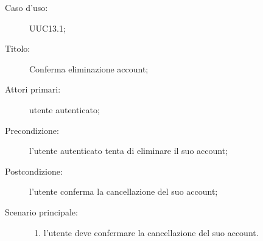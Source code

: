 \documentclass[../../../analisi-dei-requisiti.tex]{subfiles}
\begin{document}
\begin{description}
  \item[Caso d’uso:] UUC13.1;
  \item[Titolo:] Conferma eliminazione account;
  \item[Attori primari:] utente autenticato;
  \item[Precondizione:] l'utente autenticato tenta di eliminare il suo account;
  \item[Postcondizione:] l'utente conferma la cancellazione del suo account;
  \item[Scenario principale:]
        \begin{enumerate}
          \item l'utente deve confermare la cancellazione del suo account.
        \end{enumerate}
\end{description}
\end{document}
